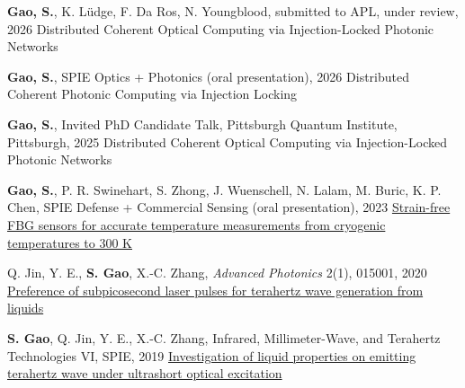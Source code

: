 
\begin{cventries}

  \cventry
    {\textbf{Gao, S.}, K. L\"udge, F. Da Ros, N. Youngblood, submitted to APL, under review, 2026}
    {Distributed Coherent Optical Computing via Injection-Locked Photonic Networks}
    {}{}{}

  \cventry
    {\textbf{Gao, S.}, SPIE Optics + Photonics (oral presentation), 2026}
    {Distributed Coherent Photonic Computing via Injection Locking}
    {}{}{}

  \cventry
    {\textbf{Gao, S.}, Invited PhD Candidate Talk, Pittsburgh Quantum Institute, Pittsburgh, 2025}
    {Distributed Coherent Optical Computing via Injection-Locked Photonic Networks}
    {}{}{}

  \cventry
    {\textbf{Gao, S.}, P. R. Swinehart, S. Zhong, J. Wuenschell, N. Lalam, M. Buric, K. P. Chen, SPIE Defense + Commercial Sensing (oral presentation), 2023}
    {\href{https://www.spiedigitallibrary.org/conference-proceedings-of-spie/12532/125320U/Strain-free-FBG-sensors-for-accurate-temperature-measurements-from-cryogenic/10.1117/12.2670079.short}{Strain-free FBG sensors for accurate temperature measurements from cryogenic temperatures to 300 K}}
    {}{}{}

  \cventry
    {Q. Jin, Y. E., \textbf{S. Gao}, X.-C. Zhang, \textit{Advanced Photonics} 2(1), 015001, 2020}
    {\href{https://www.spiedigitallibrary.org/journals/advanced-photonics/volume-2/issue-1/015001/Preference-of-subpicosecond-laser-pulses-for-terahertz-wave-generation-from/10.1117/1.AP.2.1.015001.short}{Preference of subpicosecond laser pulses for terahertz wave generation from liquids}}
    {}{}{}

  \cventry
    {\textbf{S. Gao}, Q. Jin, Y. E., X.-C. Zhang, Infrared, Millimeter-Wave, and Terahertz Technologies VI, SPIE, 2019}
    {\href{https://www.spiedigitallibrary.org/conference-proceedings-of-spie/11196/1119609/Investigation-of-liquid-properties-on-emitting-terahertz-wave-under-ultrashort/10.1117/12.2538433.short}{Investigation of liquid properties on emitting terahertz wave under ultrashort optical excitation}}
    {}{}{}


\end{cventries}
